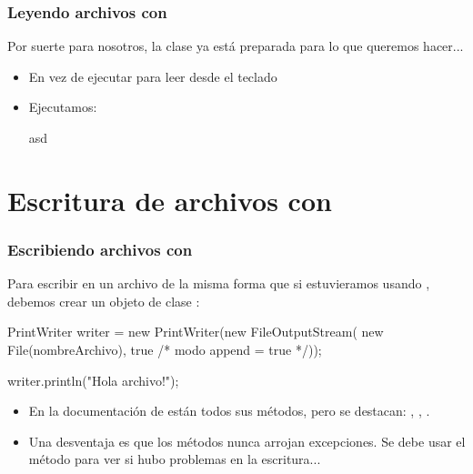 \documentclass{beamer}
\begin{document}
\begin{frame}[fragile]
  \frametitle{Leyendo archivos con }

  Por suerte para nosotros, la clase  ya está preparada
  para lo que queremos hacer...

  \begin{itemize}
  \item En vez de ejecutar  para leer
    desde el teclado

  \item Ejecutamos:

    \begin{jsmall}
    asd

      \end{jsmall}

  \end{itemize}

\end{frame}

\section{Escritura de archivos con }

\begin{frame}[fragile]
  \frametitle{Escribiendo archivos con }

  Para escribir en un archivo de la misma forma que si estuvieramos
  usando , debemos crear un objeto de clase
  :

  \begin{jsmall}
    PrintWriter writer = new PrintWriter(new FileOutputStream(
				                    new File(nombreArchivo), true /* modo append = true */));

   writer.println("Hola archivo!");
 \end{jsmall}

 \begin{itemize}[topsep]

 \item En la documentación de  están todos sus
   métodos, pero se destacan: , ,
   .

 \item Una desventaja es que los métodos nunca arrojan excepciones. Se
   debe usar el método  para ver si hubo problemas
   en la escritura...

 \end{itemize}

\end{frame}
\end{document}
